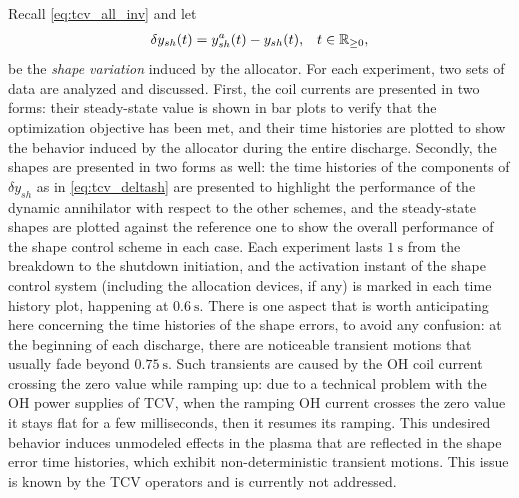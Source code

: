 Recall \eqref{eq:tcv_all_inv} and let
\begin{align}
  \label{eq:tcv_deltash}
  \delta y_{sh}(t) &= y_{sh}^a(t) - y_{sh}(t), & t\in\mathbb{R}_{\geq 0},
\end{align}
be the \emph{shape variation} induced by the allocator. For each experiment, two sets of data are analyzed and discussed. First, the coil currents are presented in two forms: their steady-state value is shown in bar plots to verify that the optimization objective has been met, and their time histories are plotted to show the behavior induced by the allocator during the entire discharge. Secondly, the shapes are presented in two forms as well: the time histories of the components of $\delta y_{sh}$ as in \eqref{eq:tcv_deltash} are presented to highlight the performance of the dynamic annihilator with respect to the other schemes, and the steady-state shapes are plotted against the reference one to show the overall performance of the shape control scheme in each case. Each experiment lasts $\SI{1}{\second}$ from the breakdown to the shutdown initiation, and the activation instant of the shape control system (including the allocation devices, if any) is marked in each time history plot, happening at $\SI{0.6}{\second}$. There is one aspect that is worth anticipating here concerning the time histories of the shape errors, to avoid any confusion: at the beginning of each discharge, there are noticeable transient motions that usually fade beyond $\SI{0.75}{\second}$. Such transients are caused by the OH coil current crossing the zero value while ramping up: due to a technical problem with the OH power supplies of TCV, when the ramping OH current crosses the zero value it stays flat for a few milliseconds, then it resumes its ramping. This undesired behavior induces unmodeled effects in the plasma that are reflected in the shape error time histories, which exhibit non-deterministic transient motions. This issue is known by the TCV operators and is currently not addressed.

